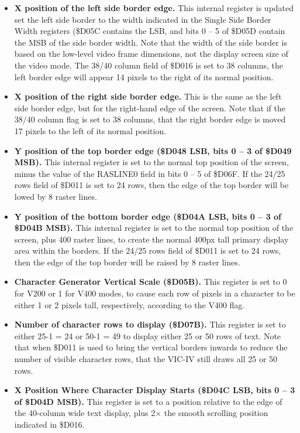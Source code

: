 \begin{itemize}
\item {\bf X position of the left side border edge.}  This internal register is updated set the left side border to the width indicated in the Single Side Border Width registers (\$D05C contains the LSB, and bits 0 -- 5 of \$D05D contain the MSB of the side border width.  Note that the width of the side border is based on the low-level video frame dimensions, not the display screen size of the video mode. The 38/40 column field of \$D016 is set to 38 columns, the left border edge will appear 14 pixels to the right of its normal position.
\item {\bf X position of the right side border edge.} This is the same as the left side border edge, but for the right-hand edge of the screen. Note that if the 38/40 column flag is set to 38 columns, that the right border edge is moved 17 pixels to the left of its normal position.
\item {\bf Y position of the top border edge (\$D048 LSB, bits 0 -- 3 of \$D049 MSB).} This internal register is set to the normal top position of the screen, minus the value of the RASLINE0 field in bits 0 -- 5 of \$D06F.  If the 24/25 rows field of \$D011 is set to 24 rows, then the edge of the top border will be lowed by 8 raster lines.
\item {\bf Y position of the bottom border edge (\$D04A LSB, bits 0 -- 3 of \$D04B MSB).} This internal register is set to the normal top position of the screen, plus 400 raster lines, to create the normal 400px tall primary display area within the borders. If the 24/25 rows field of \$D011 is set to 24 rows, then the edge of the top border will be raised by 8 raster lines.
\item {\bf Character Generator Vertical Scale (\$D05B).} This register is set to 0 for V200 or 1 for V400 modes, to cause each row of pixels in a character to be either 1 or 2 pixels tall, respectively, according to the V400 flag.
\item {\bf Number of character rows to display (\$D07B).} This register is set to either 25-1 = 24 or 50-1 = 49 to display either 25 or 50 rows of text.  Note that when \$D011 is used to bring the vertical borders inwards to reduce the number of visible character rows, that the VIC-IV still draws all 25 or 50 rows.
\item {\bf X Position Where Character Display Starts (\$D04C LSB, bits 0 -- 3 of \$D04D MSB).}  This register is set to a position relative to the edge of the 40-column wide text display, plus 2$\times$ the smooth scrolling position indicated in \$D016.

\end{itemize}
